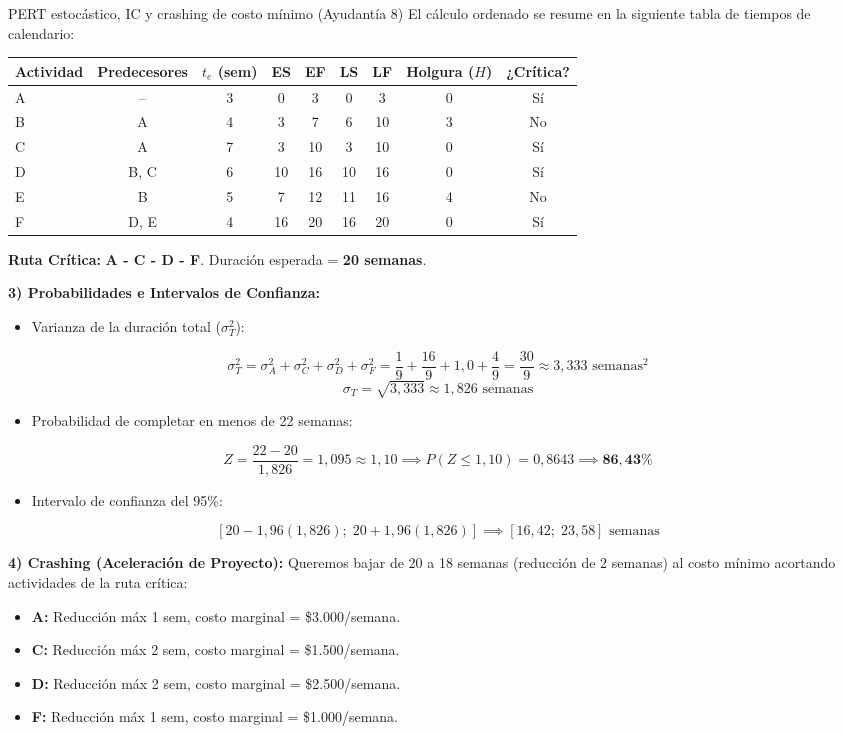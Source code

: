 \begin{ejercicio}{PERT estocástico, IC y crashing de costo mínimo (Ayudantía 8)}
El cálculo ordenado se resume en la siguiente tabla de tiempos de calendario:

\begin{center}
\small
\begin{tabular}{@{}lcccccccc@{}}
  \toprule
  \textbf{Actividad} & \textbf{Predecesores} & \textbf{$t_e$ (sem)} & \textbf{ES} & \textbf{EF} & \textbf{LS} & \textbf{LF} & \textbf{Holgura ($H$)} & \textbf{¿Crítica?} \\
  \midrule
  A & --   & 3 & 0  & 3  & 0  & 3  & 0 & Sí \\
  B & A    & 4 & 3  & 7  & 6  & 10 & 3 & No \\
  C & A    & 7 & 3  & 10 & 3  & 10 & 0 & Sí \\
  D & B, C & 6 & 10 & 16 & 10 & 16 & 0 & Sí \\
  E & B    & 5 & 7  & 12 & 11 & 16 & 4 & No \\
  F & D, E & 4 & 16 & 20 & 16 & 20 & 0 & Sí \\
  \bottomrule
\end{tabular}
\end{center}

\textbf{Ruta Crítica:} \textbf{A - C - D - F}. Duración esperada = \textbf{20 semanas}.

\textbf{3) Probabilidades e Intervalos de Confianza:}
\begin{itemize}
  \item Varianza de la duración total ($\sigma_T^2$):
\end{itemize}
    $$\sigma_T^2 = \sigma_A^2 + \sigma_C^2 + \sigma_D^2 + \sigma_F^2 = \frac{1}{9} + \frac{16}{9} + 1,0 + \frac{4}{9} = \frac{30}{9} \approx 3,333 \text{ semanas}^2$$
    $$\sigma_T = \sqrt{3,333} \approx 1,826 \text{ semanas}$$
\begin{itemize}
  \item Probabilidad de completar en menos de 22 semanas:
\end{itemize}
    $$Z = \frac{22 - 20}{1,826} = 1,095 \approx 1,10 \implies P(Z \le 1,10) = 0,8643 \implies \mathbf{86,43\%}$$
\begin{itemize}
  \item Intervalo de confianza del 95\%:
\end{itemize}
    $$[20 - 1,96(1,826); \; 20 + 1,96(1,826)] \implies [16,42; \; 23,58] \text{ semanas}$$

\textbf{4) Crashing (Aceleración de Proyecto):}
Queremos bajar de 20 a 18 semanas (reducción de 2 semanas) al costo mínimo acortando actividades de la ruta crítica:
\begin{itemize}
  \item \textbf{A:} Reducción máx 1 sem, costo marginal = \$3.000/semana.
  \item \textbf{C:} Reducción máx 2 sem, costo marginal = \$1.500/semana.
  \item \textbf{D:} Reducción máx 2 sem, costo marginal = \$2.500/semana.
  \item \textbf{F:} Reducción máx 1 sem, costo marginal = \$1.000/semana.
\end{itemize}


\end{ejercicio}
